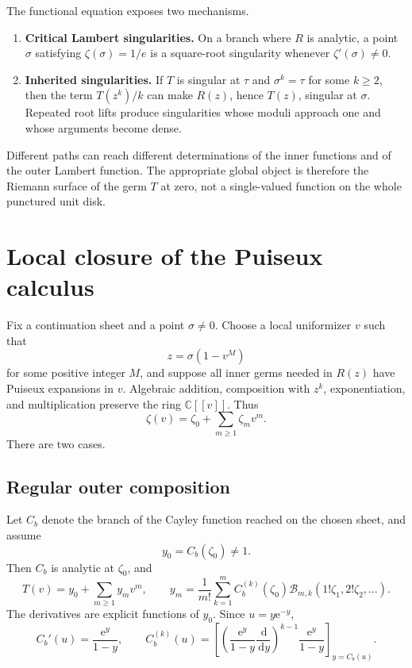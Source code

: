 \documentclass[11pt,a4paper,oneside,openany]{book}
\theoremstyle{definition}
\theoremstyle{remark}
\newcommand{\C}{\mathbb C}
\newcommand{\e}{\mathrm e}
\newcommand{\dd}{\,\mathrm d}
\newcommand{\pBell}[2]{\mathcal B_{#1,#2}}
\begin{document}
The functional equation exposes two mechanisms.
\begin{enumerate}
\item \textbf{Critical Lambert singularities.}  On a branch where $R$ is
      analytic, a point $\sigma$ satisfying
      $\zeta(\sigma)=1/e$ is a square-root singularity whenever
      $\zeta'(\sigma)\ne0$.
\item \textbf{Inherited singularities.}  If $T$ is singular at $\tau$ and
      $\sigma^k=\tau$ for some $k\ge2$, then the term $T(z^k)/k$ can make
      $R(z)$, hence $T(z)$, singular at $\sigma$.  Repeated root lifts produce
      singularities whose moduli approach one and whose arguments become
      dense.
\end{enumerate}
Different paths can reach different determinations of the inner functions and
of the outer Lambert function.  The appropriate global object is therefore the
Riemann surface of the germ $T$ at zero, not a single-valued function on the
whole punctured unit disk.

\section{Local closure of the Puiseux calculus}
Fix a continuation sheet and a point $\sigma\ne0$.  Choose a local uniformizer
$v$ such that
\begin{equation}
 z=\sigma(1-v^M)
 \label{eq:local-uniformizer}
\end{equation}
for some positive integer $M$, and suppose all inner germs needed in $R(z)$
have Puiseux expansions in $v$.  Algebraic addition, composition with $z^k$,
exponentiation, and multiplication preserve the ring $\C[[v]]$.  Thus
\begin{equation}
 \zeta(v)=\zeta_0+\sum_{m\ge1}\zeta_mv^m.
 \label{eq:zeta-local-v}
\end{equation}
There are two cases.

\subsection{Regular outer composition}
Let $C_b$ denote the branch of the Cayley function reached on the chosen sheet,
and assume
\begin{equation}
 y_0=C_b(\zeta_0)\ne1.
 \label{eq:regular-outer-condition}
\end{equation}
Then $C_b$ is analytic at $\zeta_0$, and
\begin{equation}
 T(v)=y_0+\sum_{m\ge1}y_mv^m,
 \qquad
 \boxed{
 y_m=\frac1{m!}\sum_{k=1}^m C_b^{(k)}(\zeta_0)
 \pBell mk(1!\zeta_1,2!\zeta_2,\ldots).}
 \label{eq:regular-local-composition}
\end{equation}
The derivatives are explicit functions of $y_0$.  Since
$u=y\e^{-y}$,
\begin{equation}
 C_b'(u)=\frac{\e^y}{1-y},
 \qquad
 C_b^{(k)}(u)=
 \left[\left(\frac{\e^y}{1-y}\frac{\dd}{\dd y}\right)^{k-1}
 \frac{\e^y}{1-y}\right]_{y=C_b(u)}.
 \label{eq:C-derivative-operator}
\end{equation}
\end{document}
